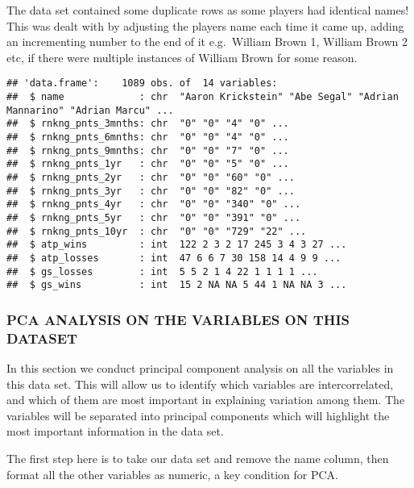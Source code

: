 \documentclass[]{article}
\begin{document}
The data set contained some duplicate rows as some players had identical
names! This was dealt with by adjusting the players name each time it
came up, adding an incrementing number to the end of it e.g.~William
Brown 1, William Brown 2 etc, if there were multiple instances of
William Brown for some reason.

\begin{verbatim}
## 'data.frame':    1089 obs. of  14 variables:
##  $ name             : chr  "Aaron Krickstein" "Abe Segal" "Adrian Mannarino" "Adrian Marcu" ...
##  $ rnkng_pnts_3mnths: chr  "0" "0" "4" "0" ...
##  $ rnkng_pnts_6mnths: chr  "0" "0" "4" "0" ...
##  $ rnkng_pnts_9mnths: chr  "0" "0" "7" "0" ...
##  $ rnkng_pnts_1yr   : chr  "0" "0" "5" "0" ...
##  $ rnkng_pnts_2yr   : chr  "0" "0" "60" "0" ...
##  $ rnkng_pnts_3yr   : chr  "0" "0" "82" "0" ...
##  $ rnkng_pnts_4yr   : chr  "0" "0" "340" "0" ...
##  $ rnkng_pnts_5yr   : chr  "0" "0" "391" "0" ...
##  $ rnkng_pnts_10yr  : chr  "0" "0" "729" "22" ...
##  $ atp_wins         : int  122 2 3 2 17 245 3 4 3 27 ...
##  $ atp_losses       : int  47 6 6 7 30 158 14 4 9 9 ...
##  $ gs_losses        : int  5 5 2 1 4 22 1 1 1 1 ...
##  $ gs_wins          : int  15 2 NA NA 5 44 1 NA NA 3 ...
\end{verbatim}

\subsubsection{PCA ANALYSIS ON THE VARIABLES ON THIS
DATASET}\label{pca-analysis-on-the-variables-on-this-dataset}

In this section we conduct principal component analysis on all the
variables in this data set. This will allow us to identify which
variables are intercorrelated, and which of them are most important in
explaining variation among them. The variables will be separated into
principal components which will highlight the most important information
in the data set.

The first step here is to take our data set and remove the name column,
then format all the other variables as numeric, a key condition for PCA.
\end{document}

